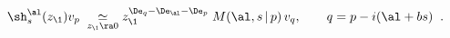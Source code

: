 \begin{equation}
\label{asym1}
\sh^{\al}_s(z_\1)v_p \;\underset{z_\1\ra 0}{\simeq}
z_\1^{\De_{q}-\De_{\al}-\De_{p}}\;
M(\al,s\,|\,p)\,v_{q}, \qquad q=p-i(\al+bs)\;\;.
\end{equation}

